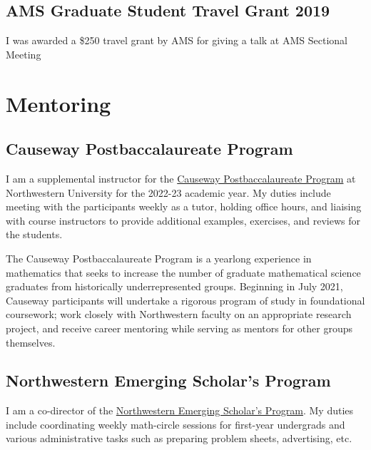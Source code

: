 \documentclass[
]{report}
\begin{document}
\hypertarget{ams-graduate-student-travel-grant-2019}{%
\section{AMS Graduate Student Travel Grant 2019}\label{ams-graduate-student-travel-grant-2019}}

I was awarded a \$250 travel grant by AMS for giving a talk at AMS Sectional Meeting

\hypertarget{mentoring}{%
\chapter{Mentoring}\label{mentoring}}

\hypertarget{causeway-postbaccalaureate-program}{%
\section{Causeway Postbaccalaureate Program}\label{causeway-postbaccalaureate-program}}

I am a supplemental instructor for the \href{https://sites.northwestern.edu/causeway/}{Causeway Postbaccalaureate Program}
at Northwestern University for the 2022-23 academic year.
My duties include meeting with the participants weekly as a tutor, holding office hours, and liaising with course instructors to provide additional examples, exercises, and reviews for the students.

The Causeway Postbaccalaureate Program is a yearlong experience in mathematics that seeks to increase the number of graduate mathematical science graduates from historically underrepresented groups. Beginning in July 2021, Causeway participants will undertake a rigorous program of study in foundational coursework; work closely with Northwestern faculty on an appropriate research project, and receive career mentoring while serving as mentors for other groups themselves.

\hypertarget{northwestern-emerging-scholars-program}{%
\section{Northwestern Emerging Scholar's Program}\label{northwestern-emerging-scholars-program}}

I am a co-director of the \href{https://www.math.northwestern.edu/undergraduate/prizes-competitions-organizations/northwestern-emerging-scholars.html}{Northwestern Emerging Scholar's
Program}.
My duties include coordinating weekly math-circle sessions for first-year undergrads and various administrative tasks such as preparing problem sheets, advertising, etc.
\end{document}
